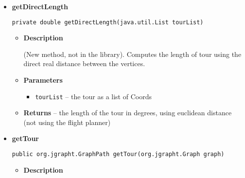 \documentclass[11pt,a4paper]{report}
\begin{document}
{{{{{{{{{{{{\begin{itemize}
{\begin{itemize}
{This code is part of the original library's improve(), but it is extracted into a method to avoid duplication as this class uses it in more than one place.
}
\item{
{\bf  Parameters}
  \begin{itemize}
   \item{
\texttt{tour} -- the tour to apply the move to}
   \item{
\texttt{newTour} -- the new tour with the move applied}
   \item{
\texttt{i} -- the first swap point}
   \item{
\texttt{j} -- the second swap point}
  \end{itemize}
}%
\end{itemize}
}%
\item{ 
\hypertarget{uk.ac.ed.inf.aqmaps.flightplanning.EnhancedTwoOptTSP.getDirectLength(java.util.List)}{{\bf  getDirectLength}\\}
\begin{lstlisting}[frame=none]
private double getDirectLength(java.util.List tourList)\end{lstlisting} %
\begin{itemize}
\item{
{\bf  Description}

(New method, not in the library). Computes the length of tour using the direct real distance between the vertices.
}
\item{
{\bf  Parameters}
  \begin{itemize}
   \item{
\texttt{tourList} -- the tour as a list of Coords}
  \end{itemize}
}%
\item{{\bf  Returns} -- 
the length of the tour in degrees, using euclidean distance (not using the flight planner) 
}%
\end{itemize}
}%
\item{ 
\hypertarget{uk.ac.ed.inf.aqmaps.flightplanning.EnhancedTwoOptTSP.getTour(org.jgrapht.Graph)}{{\bf  getTour}\\}
\begin{lstlisting}[frame=none]
public org.jgrapht.GraphPath getTour(org.jgrapht.Graph graph)\end{lstlisting} %
\begin{itemize}
\item{
{\bf  Description}

}
\end{itemize}}
\end{itemize}}}}}}}}}}}}}
\end{document}
